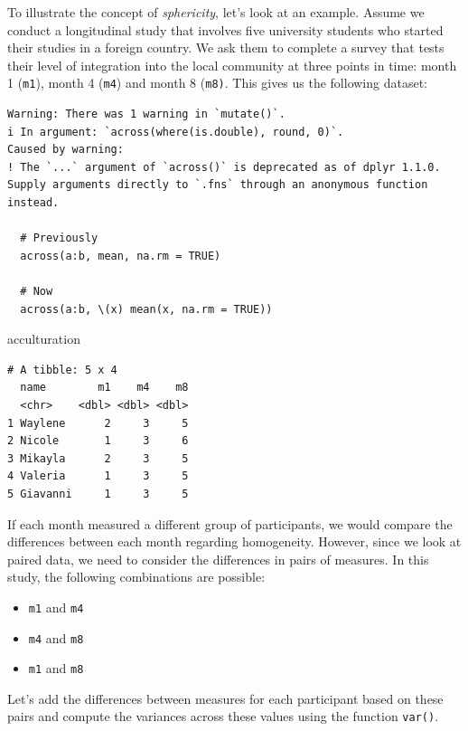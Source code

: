\documentclass[
  letterpaper,
]{krantz}
\makeatletter
\newenvironment{Shaded}{\begin{snugshade}}{\end{snugshade}}
\newcommand{\NormalTok}[1]{\textcolor[rgb]{0.00,0.23,0.31}{#1}}
\newenvironment{kframe}{%
\medskip{}
\setlength{\fboxsep}{.8em}
 \def\at@end@of@kframe{}%
 \ifinner\ifhmode%
  \def\at@end@of@kframe{\end{minipage}}%
  \begin{minipage}{\columnwidth}%
 \fi\fi%
 \def\FrameCommand##1{\hskip\@totalleftmargin \hskip-\fboxsep
 \colorbox{shadecolor}{##1}\hskip-\fboxsep
     \hskip-\linewidth \hskip-\@totalleftmargin \hskip\columnwidth}%
 \MakeFramed {\advance\hsize-\width
   \@totalleftmargin\z@ \linewidth\hsize
   \@setminipage}}%
 {\par\unskip\endMakeFramed%
 \at@end@of@kframe}
\renewenvironment{Shaded}{\begin{kframe}}{\end{kframe}}
\makeatother
\begin{document}
To illustrate the concept of \emph{sphericity}, let's look at an
example. Assume we conduct a longitudinal study that involves five
university students who started their studies in a foreign country. We
ask them to complete a survey that tests their level of integration into
the local community at three points in time: month 1 (\texttt{m1}),
month 4 (\texttt{m4}) and month 8 (\texttt{m8)}. This gives us the
following dataset:

\begin{verbatim}
Warning: There was 1 warning in `mutate()`.
i In argument: `across(where(is.double), round, 0)`.
Caused by warning:
! The `...` argument of `across()` is deprecated as of dplyr 1.1.0.
Supply arguments directly to `.fns` through an anonymous function instead.

  # Previously
  across(a:b, mean, na.rm = TRUE)

  # Now
  across(a:b, \(x) mean(x, na.rm = TRUE))
\end{verbatim}

\begin{Shaded}
\begin{Highlighting}[]
\NormalTok{acculturation}
\end{Highlighting}
\end{Shaded}

\begin{verbatim}
# A tibble: 5 x 4
  name        m1    m4    m8
  <chr>    <dbl> <dbl> <dbl>
1 Waylene      2     3     5
2 Nicole       1     3     6
3 Mikayla      2     3     5
4 Valeria      1     3     5
5 Giavanni     1     3     5
\end{verbatim}

If each month measured a different group of participants, we would
compare the differences between each month regarding homogeneity.
However, since we look at paired data, we need to consider the
differences in pairs of measures. In this study, the following
combinations are possible:

\begin{itemize}
\item
  \texttt{m1} and \texttt{m4}
\item
  \texttt{m4} and \texttt{m8}
\item
  \texttt{m1} and \texttt{m8}
\end{itemize}

Let's add the differences between measures for each participant based on
these pairs and compute the variances across these values using the
function \texttt{var()}.
\end{document}
